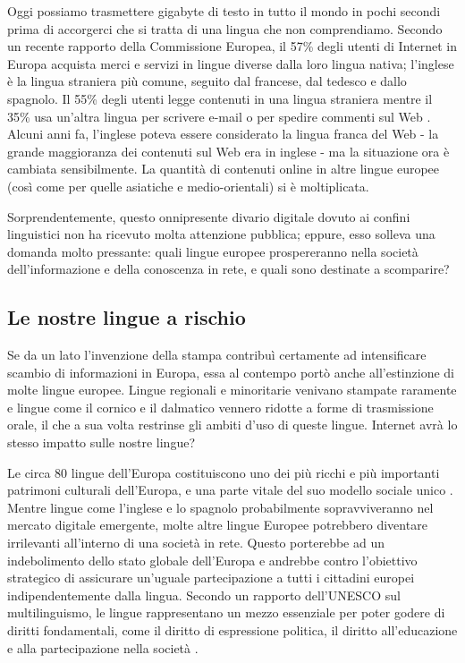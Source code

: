\documentclass[]{../../metanetpaper}
\begin{document}
\begin{multicols}{2}


Oggi possiamo trasmettere gigabyte di testo in tutto il mondo in pochi secondi
prima di accorgerci che si tratta di una lingua che non comprendiamo. Secondo
un recente rapporto della Commissione Europea, il 57\% degli utenti di
 Internet in Europa acquista merci e servizi in lingue diverse dalla loro
lingua nativa; l'inglese \`{e} la lingua straniera pi\`{u} comune, seguito dal
francese, dal tedesco e dallo spagnolo. Il 55\% degli utenti legge contenuti
in una lingua straniera mentre il 35\% usa un'altra lingua per scrivere e-mail
o per spedire commenti sul Web \cite{EC1}. Alcuni anni fa, l'inglese poteva essere considerato la lingua franca del Web - la grande maggioranza dei contenuti sul Web era in inglese - ma la situazione ora \`{e} cambiata sensibilmente. La quantit\`{a} di contenuti online in altre lingue europee (cos\`{i} come per quelle asiatiche e medio-orientali) si \`{e} moltiplicata.

Sorprendentemente, questo onnipresente divario digitale dovuto ai confini linguistici non ha ricevuto molta attenzione pubblica; eppure, esso solleva una domanda molto pressante: quali lingue europee prospereranno nella societ\`{a} dell'informazione e della conoscenza in rete, e quali sono destinate a scomparire?

\subsection{Le nostre lingue a rischio}

Se da un lato l'invenzione della stampa contribu\`{i} certamente ad intensificare scambio di informazioni in Europa, essa al contempo port\`{o} anche all'estinzione di molte lingue europee. Lingue regionali e minoritarie venivano stampate raramente e lingue come il cornico e il dalmatico vennero ridotte a forme di trasmissione orale, il che a sua volta restrinse gli ambiti d'uso di queste lingue. Internet avr\`{a} lo stesso impatto sulle nostre lingue?


Le circa 80 lingue dell'Europa costituiscono uno dei pi\`{u} ricchi e pi\`{u}
importanti patrimoni culturali dell'Europa, e una parte vitale del suo 
modello sociale unico \cite{EC2}. Mentre lingue come l'inglese e lo spagnolo
probabilmente sopravviveranno nel mercato digitale emergente, molte altre
lingue Europee potrebbero diventare irrilevanti all'interno di una societ\`{a}
in rete. Questo porterebbe ad un indebolimento dello stato globale dell'Europa
e andrebbe contro l'obiettivo strategico di assicurare un'uguale
partecipazione a tutti i cittadini europei indipendentemente dalla
lingua. Secondo un rapporto dell'UNESCO sul multilinguismo, le lingue
rappresentano un mezzo essenziale per poter godere di diritti fondamentali,
come il diritto di espressione politica, il diritto all'educazione e alla
partecipazione nella societ\`{a} \cite{Unesco1}.



\end{multicols}
\end{document}
